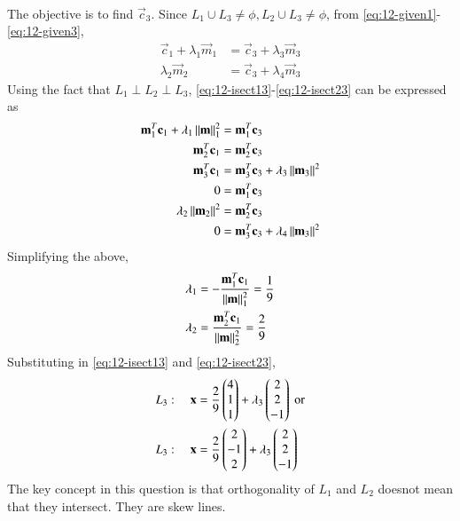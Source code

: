 \documentclass[journal,12pt,twocolumn]{IEEEtran}
\renewcommand\thesection{\arabic{section}}
\begin{document}
\begin{enumerate}[label=\thesection.\arabic*
,ref=\thesection.\theenumi]
\begin{align}
\end{align}
The objective is to find $\vec{c}_3$.  Since $L_1 \cup L_3 \ne \phi, L_2 \cup L_3 \ne \phi$, from \eqref{eq:12-given1}-\eqref{eq:12-given3},
\begin{align}
\label{eq:12-isect13}
\vec{c}_1 + \lambda_1 \vec{m}_1 &= \vec{c}_3 + \lambda_3 \vec{m}_3
\\
  \lambda_2 \vec{m}_2 &= \vec{c}_3 + \lambda_4 \vec{m}_3
\label{eq:12-isect23}
\end{align}
%
Using the fact that $L_1\perp L_2\perp L_3$, \eqref{eq:12-isect13}-\eqref{eq:12-isect23} can be expressed as
\begin{align}
\mathbf{m}_1^T\mathbf{c}_1 + \lambda_1 \left\Vert\mathbf{m}\right\Vert_1^2 &= \mathbf{m}_1^T\mathbf{c}_3 
\\
\mathbf{m}_2^T\mathbf{c}_1  &= \mathbf{m}_2^T\mathbf{c}_3 
\\
\mathbf{m}_3^T\mathbf{c}_1  &= \mathbf{m}_3^T\mathbf{c}_3 + \lambda_3 \left\Vert\mathbf{m}_3\right\Vert^2
\\
0 &= \mathbf{m}_1^T\mathbf{c}_3 
\\
  \lambda_2 \left\Vert\mathbf{m}_2\right\Vert^2 &= \mathbf{m}_2^T\mathbf{c}_3 
\\
0 &= \mathbf{m}_3^T\mathbf{c}_3  + \lambda_4 \left\Vert\mathbf{m}_3\right\Vert^2
\end{align}
%
Simplifying the above, 
\begin{align}
 \lambda_1  &= -\frac{\mathbf{m}_1^T\mathbf{c}_1}{\left\Vert\mathbf{m}\right\Vert_1^2} = \frac{1}{9}
\\
 \lambda_2  &= \frac{\mathbf{m}_2^T\mathbf{c}_1}{\left\Vert\mathbf{m}\right\Vert_2^2} =\frac{2}{9}
\end{align}
%
Substituting in \eqref{eq:12-isect13} and \eqref{eq:12-isect23},
\begin{align}
L_3: \quad \mathbf{x} &= \frac{2}{9}\begin{pmatrix}4 \\ 1 \\ 1\end{pmatrix} + \lambda_3\begin{pmatrix}2 \\ 2 \\ -1\end{pmatrix} \text{ or}
\\
L_3: \quad \mathbf{x} &= \frac{2}{9}\begin{pmatrix}2 \\-1 \\ 2\end{pmatrix} + \lambda_3\begin{pmatrix}2 \\ 2 \\ -1\end{pmatrix}
\end{align}
%
The key concept in this question is that orthogonality of $L_1$ and $L_2$ doesnot mean that they intersect.  They are skew lines.
\end{enumerate}
%
\end{document}
